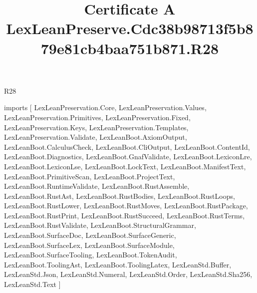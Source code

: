 \begin{lexlean}{R28}
\title{Certificate A LexLeanPreserve.Cdc38b98713f5b879e81cb4baa751b871.R28}
\begin{coremodule}
imports [
  LexLeanPreservation.Core,
  LexLeanPreservation.Values,
  LexLeanPreservation.Primitives,
  LexLeanPreservation.Fixed,
  LexLeanPreservation.Keys,
  LexLeanPreservation.Templates,
  LexLeanPreservation.Validate,
  LexLeanBoot.AxiomOutput,
  LexLeanBoot.CalculusCheck,
  LexLeanBoot.CliOutput,
  LexLeanBoot.ContentId,
  LexLeanBoot.Diagnostics,
  LexLeanBoot.GnafValidate,
  LexLeanBoot.LexiconLre,
  LexLeanBoot.LexiconLse,
  LexLeanBoot.LockText,
  LexLeanBoot.ManifestText,
  LexLeanBoot.PrimitiveScan,
  LexLeanBoot.ProjectText,
  LexLeanBoot.RuntimeValidate,
  LexLeanBoot.RustAssemble,
  LexLeanBoot.RustAst,
  LexLeanBoot.RustBodies,
  LexLeanBoot.RustLoops,
  LexLeanBoot.RustLower,
  LexLeanBoot.RustMoves,
  LexLeanBoot.RustPackage,
  LexLeanBoot.RustPrint,
  LexLeanBoot.RustSucceed,
  LexLeanBoot.RustTerms,
  LexLeanBoot.RustValidate,
  LexLeanBoot.StructuralGrammar,
  LexLeanBoot.SurfaceDoc,
  LexLeanBoot.SurfaceGeneric,
  LexLeanBoot.SurfaceLex,
  LexLeanBoot.SurfaceModule,
  LexLeanBoot.SurfaceTooling,
  LexLeanBoot.TokenAudit,
  LexLeanBoot.ToolingAst,
  LexLeanBoot.ToolingLatex,
  LexLeanStd.Buffer,
  LexLeanStd.Json,
  LexLeanStd.Numeral,
  LexLeanStd.Order,
  LexLeanStd.Sha256,
  LexLeanStd.Text
]


\end{coremodule}
\end{lexlean}
